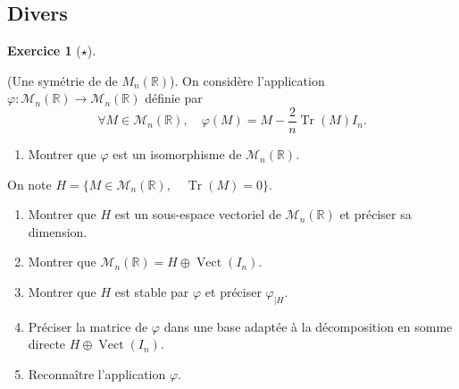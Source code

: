\documentclass[
  french,
  letterpaper,
  DIV=11,
  numbers=noendperiod]{scrreprt}
\providecommand{\tightlist}{%
  \setlength{\itemsep}{0pt}\setlength{\parskip}{0pt}}
\theoremstyle{plain}
\theoremstyle{definition}
\theoremstyle{plain}
\theoremstyle{plain}
\theoremstyle{definition}
\newtheorem{exercise}{Exercice}[chapter]
\theoremstyle{definition}
\theoremstyle{plain}
\theoremstyle{remark}
\begin{document}
\subsection{Divers}\label{divers-2}

\begin{exercise}[\(\star\)]\protect\hypertarget{exr-03-sym}{}\label{exr-03-sym}

(Une symétrie de de \(M_{n}(\mathbb{R})\)). On considère l'application
\(\varphi:\mathcal{M}_{n}(\mathbb{R})\to \mathcal{M}_n(\mathbb{R})\)
définie par
\[\forall M\in\mathcal{M}_{n}(\mathbb{R}),\quad \varphi(M) = M - \frac{2}{n}\operatorname{Tr}(M)I_n.\]

\begin{enumerate}
\def\labelenumi{\arabic{enumi}.}
\tightlist
\item
  Montrer que \(\varphi\) est un isomorphisme de
  \(\mathcal{M}_n(\mathbb{R})\).
\end{enumerate}

On note
\(H = \{M\in\mathcal{M}_n(\mathbb{R}),\quad \operatorname{Tr}(M) = 0\}\).

\begin{enumerate}
\def\labelenumi{\arabic{enumi}.}
\item
  Montrer que \(H\) est un sous-espace vectoriel de
  \(\mathcal{M}_n(\mathbb{R})\) et préciser sa dimension.
\item
  Montrer que
  \(\mathcal{M}_{n}(\mathbb{R}) = H\oplus \operatorname{Vect}(I_n)\).
\item
  Montrer que \(H\) est stable par \(\varphi\) et préciser
  \(\varphi_{|H}\).
\item
  Préciser la matrice de \(\varphi\) dans une base adaptée à la
  décomposition en somme directe \(H\oplus \operatorname{Vect}(I_n)\).
\item
  Reconnaître l'application \(\varphi\).
\end{enumerate}

\end{exercise}
\end{document}
